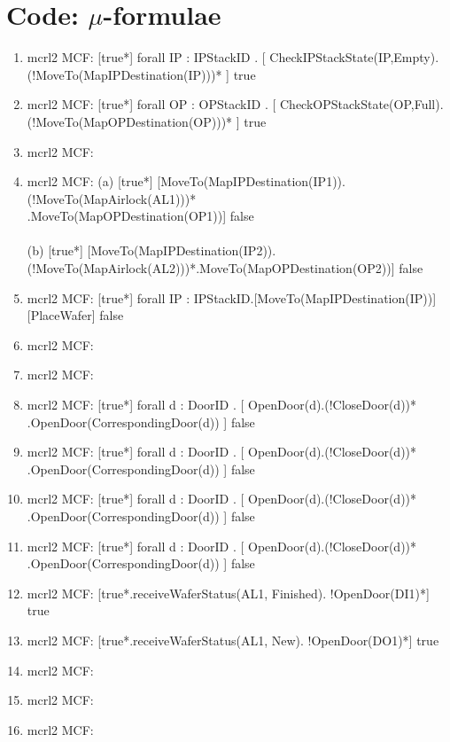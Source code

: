 \documentclass[a4paper,12pt]{article}
\begin{document}
\section{Code: $\mu$-formulae}
\begin{enumerate}
\item mcrl2 MCF: [true*] forall IP : IPStackID . [ CheckIPStackState(IP,Empty).
\\(!MoveTo(MapIPDestination(IP)))* ] true
\item mcrl2 MCF: [true*] forall OP : OPStackID . [ CheckOPStackState(OP,Full).
\\(!MoveTo(MapOPDestination(OP)))* ] true
\item mcrl2 MCF:
\item mcrl2 MCF: (a) [true*] [MoveTo(MapIPDestination(IP1)). (!MoveTo(MapAirlock(AL1)))*
\\.MoveTo(MapOPDestination(OP1))] false
\\
\\ (b) [true*] [MoveTo(MapIPDestination(IP2)). (!MoveTo(MapAirlock(AL2)))*.MoveTo(MapOPDestination(OP2))] false
\item mcrl2 MCF: [true*] forall IP : IPStackID.[MoveTo(MapIPDestination(IP))] [PlaceWafer] false
\item mcrl2 MCF:
\item mcrl2 MCF:
\item mcrl2 MCF: [true*] forall d : DoorID . [ OpenDoor(d).(!CloseDoor(d))*
\\.OpenDoor(CorrespondingDoor(d)) ] false
\item mcrl2 MCF: [true*] forall d : DoorID . [ OpenDoor(d).(!CloseDoor(d))*
\\.OpenDoor(CorrespondingDoor(d)) ] false
\item mcrl2 MCF: [true*] forall d : DoorID . [ OpenDoor(d).(!CloseDoor(d))*
\\.OpenDoor(CorrespondingDoor(d)) ] false
\item mcrl2 MCF: [true*] forall d : DoorID . [ OpenDoor(d).(!CloseDoor(d))*
\\.OpenDoor(CorrespondingDoor(d)) ] false
\item mcrl2 MCF: [true*.receiveWaferStatus(AL1, Finished). !OpenDoor(DI1)*] true
\item mcrl2 MCF: [true*.receiveWaferStatus(AL1, New). !OpenDoor(DO1)*] true
\item mcrl2 MCF: 
\item mcrl2 MCF: 
\item mcrl2 MCF: 
\end{enumerate}
\end{document}
